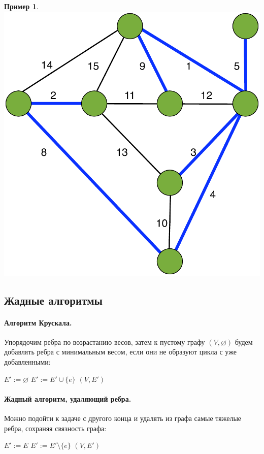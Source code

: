 \documentclass[a4paper,12pt]{article}
\newtheorem*{example}{Пример}
\begin{document}
	\begin{example}
		\includegraphics[width=.6\linewidth]{spanning}
	\end{example}

\subsection{Жадные алгоритмы}
\paragraph{Алгоритм Крускала.} Упорядочим ребра по возрастанию весов, затем к пустому графу $(V, \varnothing)$ будем добавлять ребра с минимальным весом, если они не образуют цикла с уже добавленными:

\begin{algorithmic}
	\State $E' := \varnothing$
			\State $E' := E' \cup \{e\}$
		 \EndIf
	\EndFor
	\Return $(V, E')$
\end{algorithmic}

\paragraph{Жадный алгоритм, удаляющий ребра.} Можно подойти к задаче с другого конца и удалять из графа самые тяжелые ребра, сохраняя связность графа:

\begin{algorithmic}
	\State $E' := E$
			\State $E' := E' \setminus \{e\}$
		 \EndIf
	\EndFor
	\Return $(V, E')$
\end{algorithmic}
\end{document}
